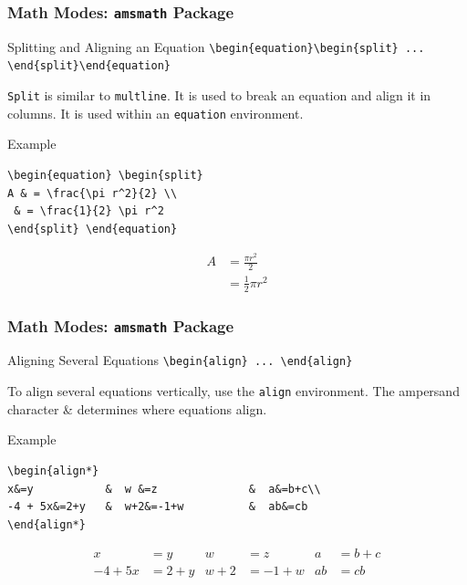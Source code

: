 \begin{frame}[fragile]
\frametitle{Math Modes: \texttt{amsmath} Package} 
\begin{block}{Splitting and Aligning an Equation }
\small
\verb|\begin{equation}\begin{split} ... \end{split}\end{equation}| \\
\end{block}
\verb|Split| is similar to \verb|multline|. It is used to break an equation and align it in columns. It is used within an \verb|equation| environment. 
\begin{exampleblock}{Example}
\small
\begin{verbatim}
\begin{equation} \begin{split}
A & = \frac{\pi r^2}{2} \\
 & = \frac{1}{2} \pi r^2
\end{split} \end{equation}
\end{verbatim}
\begin{equation} \begin{split}
A & = \frac{\pi r^2}{2} \\
 & = \frac{1}{2} \pi r^2
\end{split} \end{equation}
\end{exampleblock}
\end{frame}


\begin{frame}[fragile]
\frametitle{Math Modes: \texttt{amsmath} Package} 
\begin{block}{Aligning Several Equations}
\small
\verb|\begin{align} ... \end{align}| \\
\end{block}
To align several equations vertically, use the \verb|align| environment. The ampersand character \& determines where equations align.
\begin{exampleblock}{Example}
\small
\begin{verbatim}
\begin{align*}
x&=y           &  w &=z              &  a&=b+c\\
-4 + 5x&=2+y   &  w+2&=-1+w          &  ab&=cb
\end{align*}
\end{verbatim}
\begin{align*}
x&=y           &  w &=z              &  a&=b+c\\
-4 + 5x&=2+y   &  w+2&=-1+w          &  ab&=cb
\end{align*}
\end{exampleblock}
\end{frame}


